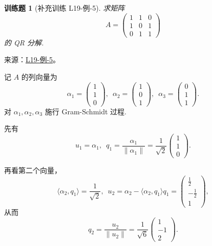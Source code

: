 \documentclass[12pt,fontset=fandol]{ctexart}
\newtheorem{exercise}{训练题}[section]
\begin{document}
\begin{exercise}[补充训练 L19-例-5]\label{prob:L19-例-5}
求矩阵
    \[
        A = \begin{pmatrix}
            1 & 1 & 0 \\
            1 & 0 & 1 \\
            0 & 1 & 1
        \end{pmatrix}
    \]
    的 QR 分解.
\end{exercise}
\noindent 来源：\href{https://github.com/yhwu-is/Linear-Algebra-Left-Undone/blob/new/%E8%AE%B2%E4%B9%89/%E4%B8%93%E9%A2%98/19%20%E5%86%85%E7%A7%AF%E7%A9%BA%E9%97%B4.tex}{L19-例-5}。
\begin{solve}
记 $A$ 的列向量为
    \[
        \alpha_1 = \begin{pmatrix}
            1 \\
            1 \\
            0
        \end{pmatrix}, \enspace
        \alpha_2 = \begin{pmatrix}
            1 \\
            0 \\
            1
        \end{pmatrix}, \enspace
        \alpha_3 = \begin{pmatrix}
            0 \\
            1 \\
            1
        \end{pmatrix}.
    \]
    对 $\alpha_1, \alpha_2, \alpha_3$ 施行 Gram-Schmidt 过程.

    先有
    \[
        u_1 = \alpha_1, \enspace q_1 = \frac{\alpha_1}{\lVert \alpha_1 \rVert}
        = \frac{1}{\sqrt{2}}
        \begin{pmatrix}
            1 \\
            1 \\
            0
        \end{pmatrix}.
    \]

    再看第二个向量，
    \[
        \langle \alpha_2, q_1 \rangle = \frac{1}{\sqrt{2}}, \enspace
        u_2 = \alpha_2 - \langle \alpha_2, q_1 \rangle q_1
        =
        \begin{pmatrix}
            \frac{1}{2} \\
            -\frac{1}{2} \\
            1
        \end{pmatrix},
    \]
    从而
    \[
        q_2 = \frac{u_2}{\lVert u_2 \rVert}
        = \frac{1}{\sqrt{6}}
        \begin{pmatrix}
            1 \\
            -1 \\
            2
        \end{pmatrix}.
    \]


\end{solve}
\end{document}
